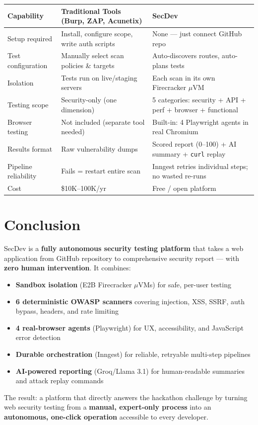 \documentclass[11pt, a4paper]{article}
\begin{document}
\begin{center}
\renewcommand{\arraystretch}{1.35}
\small
\begin{tabularx}{\textwidth}{@{}l X X@{}}
\toprule
\textbf{Capability} & \textbf{Traditional Tools (Burp, ZAP, Acunetix)} & \textbf{SecDev} \\
\midrule
Setup required      & Install, configure scope, write auth scripts & None --- just connect GitHub repo \\
Test configuration  & Manually select scan policies \& targets & Auto-discovers routes, auto-plans tests \\
Isolation           & Tests run on live/staging servers & Each scan in its own Firecracker $\mu$VM \\
Testing scope       & Security-only (one dimension) & 5 categories: security + API + perf + browser + functional \\
Browser testing     & Not included (separate tool needed) & Built-in: 4 Playwright agents in real Chromium \\
Results format      & Raw vulnerability dumps & Scored report (0--100) + AI summary + \texttt{curl} replay \\
Pipeline reliability & Fails = restart entire scan & Inngest retries individual steps; no wasted re-runs \\
Cost                & \$10K--100K/yr & Free / open platform \\
\bottomrule
\end{tabularx}
\end{center}

\section{Conclusion}

\begin{tcolorbox}[highlight, title={\faCheckCircle\enspace Summary}]
SecDev is a \textbf{fully autonomous security testing platform} that takes a web application from GitHub repository to comprehensive security report --- with \textbf{zero human intervention}. It combines:
\begin{itemize}[leftmargin=1.2em, itemsep=2pt, topsep=2pt]
  \item \textbf{Sandbox isolation} (E2B Firecracker $\mu$VMs) for safe, per-user testing
  \item \textbf{6 deterministic OWASP scanners} covering injection, XSS, SSRF, auth bypass, headers, and rate limiting
  \item \textbf{4 real-browser agents} (Playwright) for UX, accessibility, and JavaScript error detection
  \item \textbf{Durable orchestration} (Inngest) for reliable, retryable multi-step pipelines
  \item \textbf{AI-powered reporting} (Groq/Llama 3.1) for human-readable summaries and attack replay commands
\end{itemize}
The result: a platform that directly answers the hackathon challenge by turning web security testing from a \textbf{manual, expert-only process} into an \textbf{autonomous, one-click operation} accessible to every developer.
\end{tcolorbox}
\end{document}
